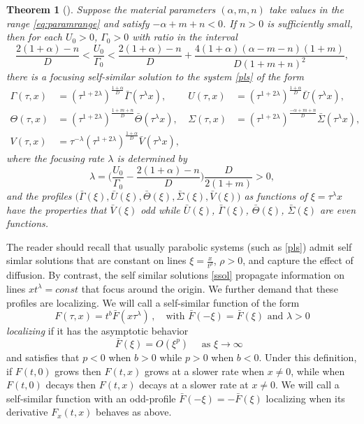 \documentclass[a4paper,11pt]{article}
\def\bG{{\bar{\Gamma}}}
\def\bV{{\bar{V}}}
\def\bTh{{\bar{\Theta}}}
\def\bS{{\bar{\Sigma}}}
\def\bU{{\bar{U}}}
\def\BO{{{O}}}
\newtheorem{theorem}{Theorem}
\theoremstyle{remark}
\begin{document}
\begin{theorem}[\cite{LKT17}] \label{mainthm1}
Suppose the material parameters $(\alpha, m, n)$ take values in the range \eqref{eq:paramrange} and satisfy $-\alpha+m+n<0$. If $n>0$ is sufficiently small, then
for each $U_0>0$, $\Gamma_0>0$ with ratio in the interval
\begin{equation} \label{eq:restriction}
 \frac{2(1+\alpha) -n}{D} < \frac{U _0}{\Gamma _0} < \frac{2(1+\alpha) -n}{D} + \frac{4(1+\alpha)(\alpha-m-n)(1+m)}{D(1+m+n)^2},
\end{equation}
there is a focusing self-similar solution to the system \eqref{pls} of the form
\begin{equation}
\label{ssol}
\begin{aligned}
 \Gamma (\tau,x) &= \left(\tau^{1+ 2 \lambda}\right) ^{ \frac{1+ \alpha}{D}} \bG(\tau ^\lambda x), & U (\tau,x) &=\left(\tau^{1+ 2 \lambda}\right) ^{ \frac{1+ \alpha}{D}} \bU( \tau ^\lambda x),\\
 \Theta (\tau,x) &= \left(\tau^{1+ 2 \lambda}\right) ^{ \frac{1+ m +n}{D}} \bTh( \tau ^\lambda x), & \Sigma (\tau,x) &= \left(\tau^{1+ 2 \lambda}\right) ^{ \frac{- \alpha +m+n}{D}} \bS( \tau ^\lambda x),\\
 V (\tau,x) &= \tau ^{-\lambda} \left(\tau^{1+ 2 \lambda}\right) ^{ \frac{1+ \alpha}{D}} \bV( \tau ^\lambda x),
\end{aligned}
\end{equation}
where the focusing rate $\lambda$ is determined by 
\begin{equation} \label{eq:lambda}
 \lambda = \Big(\frac{U _0}{\Gamma _0} - \frac{2(1+\alpha)-n}{D}\Big)\frac{D}{2(1+m)}  > 0 ,
\end{equation}
and the profiles $\big(\bG(\xi), \bU(\xi), \bTh(\xi),\bS(\xi),\bV(\xi)\big)$ as  functions of $\xi = \tau^\lambda x$ have the properties
that $\bV(\xi)$ odd while  $\bU (\xi)$, $\bG(\xi)$, $\bTh(\xi)$, $\bS(\xi)$ are even functions.
\end{theorem}


The reader should recall that  usually parabolic systems (such as \eqref{pls}) admit self simlar solutions that are constant on lines $\xi = \frac{x}{t^\rho}$, $\rho > 0$, and capture
the effect of diffusion. By contrast, the self similar solutions  \eqref{ssol} propagate information on lines $x t^\lambda = const$ that focus around the origin. 
We further demand that these profiles are localizing. We will call a self-similar function of the form
$$
F(\tau,x) = t^b \bar F(x \tau^\lambda) \, , \quad \mbox{with $\bar F(-\xi) = \bar F(\xi)$ and $\lambda > 0$}
$$
{\it localizing} if it has the asymptotic behavior
$$
\bar F(\xi) = \BO (\xi^p)    \quad \mbox{ as $\xi \to \infty$ }
$$
and satisfies that $p < 0$ when $b > 0$ while $p > 0$ when $b < 0$. Under this definition, if $F(t,0)$ grows then $F(t,x)$ grows at a slower
rate when $x \ne 0$, while when $F(t,0)$ decays then $F(t,x)$ decays at a slower rate at $x \ne 0$. We will call a self-similar function with an odd-profile 
$\bar F(-\xi) = - \bar F(\xi)$ localizing when its derivative $F_x( t,x)$  behaves as above.
\end{document}
